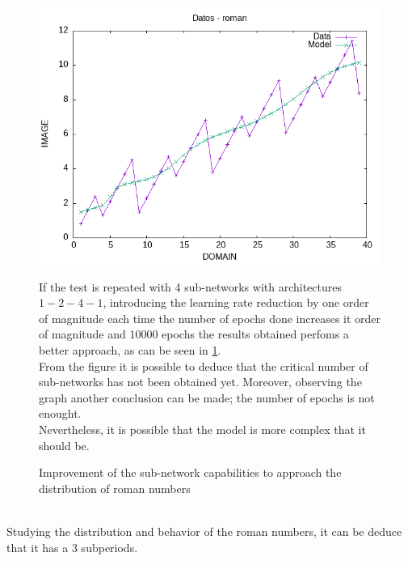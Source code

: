 \documentclass[a4paper, 11pt]{article}
\begin{document}
\begin{figure}[h]
    \begin{minipage}{5.5cm}
        \begin{center}
            \includegraphics[width = 1 \linewidth]{img/roman/roman_third_approach.png}
            \caption{Improvement of the sub-network capabilities to approach the distribution of roman numbers}
            \label{second-approach}
        \end{center}
    \end{minipage} \hspace{1em}
    \begin{minipage}{9cm}
        If the test is repeated with 4 sub-networks with architectures $1-2-4-1$, introducing the learning rate reduction by one order of magnitude each time the number of epochs done increases it order of magnitude and $10000$ epochs the results obtained perfoms a better approach, as can be seen in \ref{second-approach}.\\
        From the figure it is possible to deduce that the critical number of sub-networks has not been obtained yet. Moreover, observing the graph another conclusion can be made; the number of epochs is not enought.\\
        Nevertheless, it is possible that the model is more complex that it should be.
    \end{minipage}
\end{figure}\\
Studying the distribution and behavior of the roman numbers, it can be deduce that it has a 3 subperiods.\\
\end{document}
